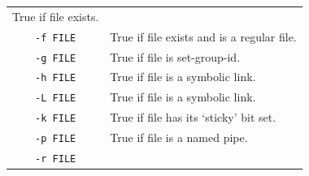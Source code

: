 \documentclass[doctor,openright,twoside]{sjtuthesis}
\newcommand{\passthrough}[1]{#1}
\theoremstyle{plain}
\theoremstyle{definition}
\theoremstyle{remark}
\theoremstyle{ocrenumbox}
\theoremstyle{plain}
\begin{document}
\begin{longtable}[]{@{}cl@{}}
\begin{minipage}[t]{0.74\columnwidth}
True if file exists.\strut
\end{minipage}\tabularnewline
\begin{minipage}[t]{0.20\columnwidth}\centering
\passthrough{\lstinline!-f FILE!}\strut
\end{minipage} & \begin{minipage}[t]{0.74\columnwidth}\raggedright
True if file exists and is a regular file.\strut
\end{minipage}\tabularnewline
\begin{minipage}[t]{0.20\columnwidth}\centering
\passthrough{\lstinline!-g FILE!}\strut
\end{minipage} & \begin{minipage}[t]{0.74\columnwidth}\raggedright
True if file is set-group-id.\strut
\end{minipage}\tabularnewline
\begin{minipage}[t]{0.20\columnwidth}\centering
\passthrough{\lstinline!-h FILE!}\strut
\end{minipage} & \begin{minipage}[t]{0.74\columnwidth}\raggedright
True if file is a symbolic link.\strut
\end{minipage}\tabularnewline
\begin{minipage}[t]{0.20\columnwidth}\centering
\passthrough{\lstinline!-L FILE!}\strut
\end{minipage} & \begin{minipage}[t]{0.74\columnwidth}\raggedright
True if file is a symbolic link.\strut
\end{minipage}\tabularnewline
\begin{minipage}[t]{0.20\columnwidth}\centering
\passthrough{\lstinline!-k FILE!}\strut
\end{minipage} & \begin{minipage}[t]{0.74\columnwidth}\raggedright
True if file has its `sticky' bit set.\strut
\end{minipage}\tabularnewline
\begin{minipage}[t]{0.20\columnwidth}\centering
\passthrough{\lstinline!-p FILE!}\strut
\end{minipage} & \begin{minipage}[t]{0.74\columnwidth}\raggedright
True if file is a named pipe.\strut
\end{minipage}\tabularnewline
\begin{minipage}[t]{0.20\columnwidth}\centering
\passthrough{\lstinline!-r FILE!}\strut
\end{minipage} & \begin{minipage}[t]{0.74\columnwidth}\raggedright

\end{minipage}
\end{longtable}
\end{document}
